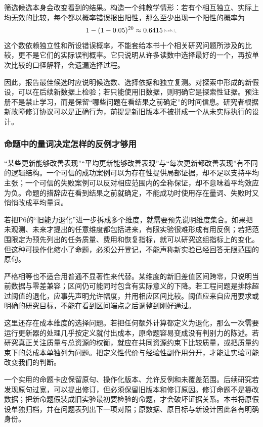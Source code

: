 筛选候选本身会改变看到的结果。构造一个纯教学情形：若有个相互独立、实际上均无效的比较，每个都以概率错误报出阳性，那么至少出现一个阳性的概率为
\[
 1-(1-0.05)^{20}\approx\calcnum{0.6415}.
\]
这个数依赖独立性和所设错误概率，不能套给本书十个相关研究问题所涉及的比较，更不是它们的实际误判概率。它只说明从许多读数中选择最好的一个，再按单次比较的口径解释，会遗漏选择过程。

因此，报告最佳候选时应说明候选数、选择依据和独立复测。对探索中形成的新假设，可以在后续新数据上检验；若只能使用旧数据，则明确它是探索性证据。预注册不是禁止学习，而是保留“哪些问题在看结果之前确定”的时间信息。研究者根据新故障修订协议可以是正确行为，前提是新旧版本不被拼成一个从未实际执行的设计。

\subsubsection{命题中的量词决定怎样的反例才够用}

“某些更新能够改善表现”“平均更新能够改善表现”与“每次更新都改善表现”有不同的逻辑结构。一个可信的成功案例可以为存在性提供局部证据，却不足以支持平均主张；一个可信的失败案例可以反对相应范围内的全称保证，却不意味着平均效应为负。命题的措辞应在看到结果之前就确定，不能成功时使用存在量词、失败时又悄悄改成平均量词。

若把P6的“旧能力退化”进一步拆成多个维度，就需要预先说明维度集合。如果把未观测、未来才提出的任意维度都包括进来，有限实验很难形成有用反例；若把范围限定为预先列出的任务质量、费用和恢复指标，就可以研究这组指标上的变化。但这种可操作化缩小了命题，必须公开登记，不能声称新实验已经回答无限范围的原句。

严格相等也不适合用普通不显著性来代替。某维度的新旧差值区间跨零，只说明当前数据与零差兼容；区间仍可能同时包含有实际意义的下降。若工程问题是排除超过阈值的退化，应事先声明允许幅度，并用相应区间比较。阈值应来自应用要求或明确的研究目标，不能在看到区间端点之后调整到刚好通过。

这里还存在成本维度的选择问题。若把任何额外计算都定义为退化，那么一次需要运行更新器的处理几乎按定义就付出成本，原命题容易变成没有判别力的陈述。若研究真正关注质量与总资源的权衡，就应在共同资源约束下比较质量，或把质量约束下的总成本单独列为问题。把定义性代价与经验性副作用分开，才能让实验可能改变我们的判断。

一个实用的命题卡应保留原句、操作化版本、允许反例和未覆盖范围。后续研究若发现原句过宽，可以提出修订，但必须保留旧版本和修订原因。修订命题不是篡改数据；把新命题假装成旧实验最初要检验的命题，才会破坏证据关系。本书将原假设单独归档，并在问题表列出下一项对照；原数据、原目标与新设计因此各有明确身份。

